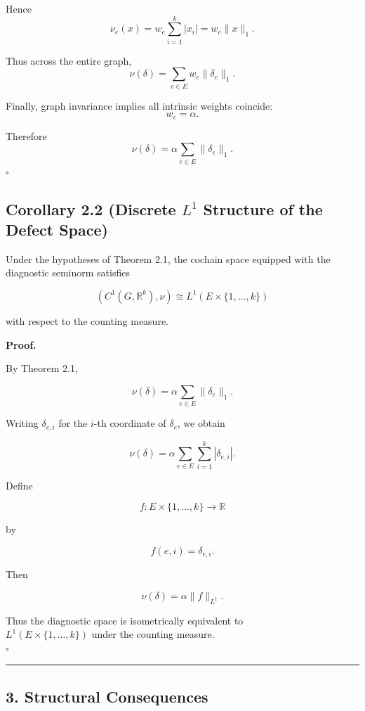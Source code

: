 \documentclass[
]{amsart}
\begin{document}
Hence \[ \nu_e(x)=w_e\sum_{i=1}^k |x_i|=w_e\|x\|_1. \]

Thus across the entire graph,
\[ \nu(\delta)=\sum_{e\in E} w_e\|\delta_e\|_1. \]

Finally, graph invariance implies all intrinsic weights coincide:
\[ w_e=\alpha. \]

Therefore \[ \nu(\delta)=\alpha\sum_{e\in E}\|\delta_e\|_1. \]
\(\square\)

\hypertarget{corollary-2.2-discrete-l1-structure-of-the-defect-space}{%
\subsection{\texorpdfstring{Corollary 2.2 (Discrete \(L^1\) Structure of
the Defect
Space)}{Corollary 2.2 (Discrete L\^{}1 Structure of the Defect Space)}}\label{corollary-2.2-discrete-l1-structure-of-the-defect-space}}

Under the hypotheses of Theorem 2.1, the cochain space equipped with the
diagnostic seminorm satisfies

\[
(C^1(G,\mathbb{R}^k),\nu)
\cong
L^1(E\times\{1,\dots,k\})
\]

with respect to the counting measure.

\textbf{Proof.}

By Theorem 2.1,

\[
\nu(\delta)
=
\alpha\sum_{e\in E}\|\delta_e\|_1.
\]

Writing \(\delta_{e,i}\) for the \(i\)-th coordinate of \(\delta_e\), we
obtain

\[
\nu(\delta)
=
\alpha\sum_{e\in E}\sum_{i=1}^k |\delta_{e,i}|.
\]

Define

\[
f:E\times\{1,\dots,k\}\to\mathbb{R}
\]

by

\[
f(e,i)=\delta_{e,i}.
\]

Then

\[
\nu(\delta)
=
\alpha\|f\|_{L^1}.
\]

Thus the diagnostic space is isometrically equivalent to\\
\(L^1(E\times\{1,\dots,k\})\) under the counting measure.\\
\(\square\)

\begin{center}\rule{0.5\linewidth}{0.5pt}\end{center}

\hypertarget{structural-consequences}{%
\subsection{3. Structural Consequences}\label{structural-consequences}}
\end{document}
